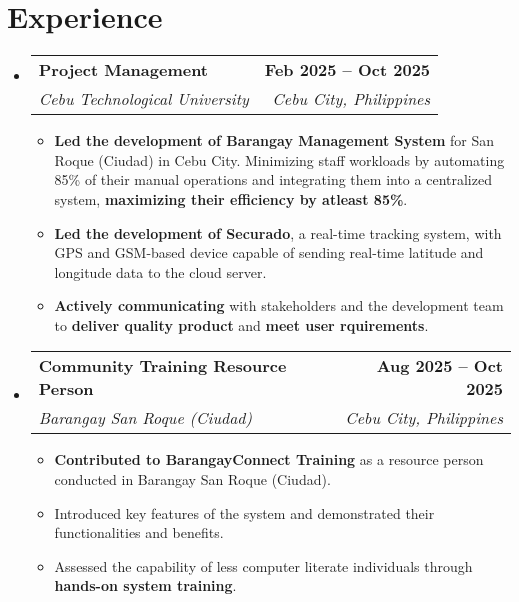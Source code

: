 \documentclass[letterpaper,11pt]{article}
\makeatletter
\newcommand{\resumeItem}[1]{
  \item\small{
    {#1 \vspace{0pt}}
  }
}
\newcommand{\resumeSubheading}[4]{
  \vspace{-2pt}\item
    \begin{tabular*}{1.0\textwidth}[t]{l@{\extracolsep{\fill}}r}
      \textbf{#1} & \textbf{\small #2} \\
      \textit{\small#3} & \textit{\small #4} \\
    \end{tabular*}\vspace{-7pt}
}
\newcommand{\resumeSubHeadingListStart}{\begin{itemize}[leftmargin=0.0in, label={}]}
\newcommand{\resumeSubHeadingListEnd}{\end{itemize}}\vspace{0pt}
\newcommand{\resumeItemListStart}{\begin{itemize}}
\newcommand{\resumeItemListEnd}{\end{itemize}\vspace{-5pt}}
\makeatother
\begin{document}
\section{Experience}
    \resumeSubHeadingListStart
            \resumeSubheading{Project Management}{Feb 2025 -- Oct 2025}{Cebu Technological University}{Cebu City, Philippines} 
                \resumeItemListStart
                  \resumeItem{\textbf{Led the development of Barangay Management System} for San Roque (Ciudad) in Cebu City. Minimizing staff workloads by automating 85\% of their manual operations and integrating them into a centralized system, \textbf{maximizing their efficiency by atleast 85\%}.}
                  \resumeItem{\textbf{Led the development of Securado}, a real-time tracking system, with GPS and GSM-based device capable of sending real-time latitude and longitude data to the cloud server.}
                  \resumeItem{\textbf{Actively communicating} with stakeholders and the development team to \textbf{deliver quality product} and \textbf{meet user rquirements}.}
                \resumeItemListEnd
            \resumeSubheading{Community Training Resource Person}{Aug 2025 -- Oct 2025}{Barangay San Roque (Ciudad)}{Cebu City, Philippines} 
                \resumeItemListStart
                  \resumeItem{\textbf{Contributed to BarangayConnect Training} as a resource person conducted in Barangay San Roque (Ciudad).}
                  \resumeItem{Introduced key features of the system and demonstrated their functionalities and benefits.}
                  \resumeItem{Assessed the capability of less computer literate individuals through \textbf{hands-on system training}.}
                \resumeItemListEnd

    \resumeSubHeadingListEnd
    \vspace{-12pt}

\end{document}
